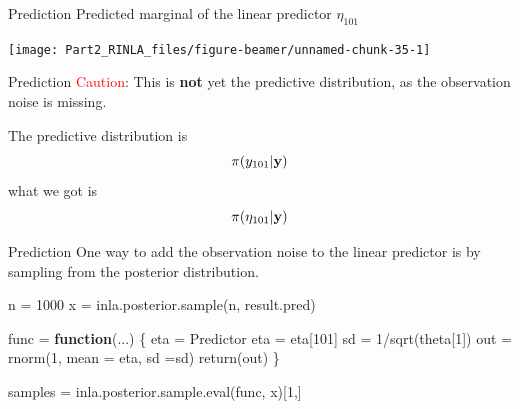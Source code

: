 \documentclass[
  ignorenonframetext,
]{beamer}
\newenvironment{Shaded}{\begin{snugshade}}{\end{snugshade}}
\newcommand{\AttributeTok}[1]{\textcolor[rgb]{0.77,0.63,0.00}{#1}}
\newcommand{\ControlFlowTok}[1]{\textcolor[rgb]{0.13,0.29,0.53}{\textbf{#1}}}
\newcommand{\DecValTok}[1]{\textcolor[rgb]{0.00,0.00,0.81}{#1}}
\newcommand{\FunctionTok}[1]{\textcolor[rgb]{0.00,0.00,0.00}{#1}}
\newcommand{\NormalTok}[1]{#1}
\newcommand{\OtherTok}[1]{\textcolor[rgb]{0.56,0.35,0.01}{#1}}
\newcommand{\SpecialCharTok}[1]{\textcolor[rgb]{0.00,0.00,0.00}{#1}}
\begin{document}
\begin{frame}[fragile]{Prediction}
\protect\hypertarget{prediction-2}{}
Predicted marginal of the linear predictor \(\eta_{101}\)

\begin{Shaded}
\end{Shaded}

\begin{center}\texttt{[image: Part2\_RINLA\_files/figure-beamer/unnamed-chunk-35-1]} \end{center}
\end{frame}

\begin{frame}{Prediction}
\protect\hypertarget{prediction-3}{}
\textcolor{red}{Caution}: This is \textbf{not} yet the predictive
distribution, as the observation noise is missing.

The predictive distribution is \[
\pi(y_{101}|\bf{y})
\] what we got is \[
\pi(\eta_{101}|\bf{y})
\]
\end{frame}

\begin{frame}[fragile]{Prediction}
\protect\hypertarget{prediction-4}{}
One way to add the observation noise to the linear predictor is by
sampling from the posterior distribution.

\small

\begin{Shaded}
\begin{Highlighting}[]
\NormalTok{n }\OtherTok{=} \DecValTok{1000}
\NormalTok{x }\OtherTok{=} \FunctionTok{inla.posterior.sample}\NormalTok{(n, result.pred)}

\NormalTok{func }\OtherTok{=} \ControlFlowTok{function}\NormalTok{(...)}
\NormalTok{\{}
\NormalTok{  eta }\OtherTok{=}\NormalTok{ Predictor}
\NormalTok{  eta }\OtherTok{=}\NormalTok{ eta[}\DecValTok{101}\NormalTok{]}
\NormalTok{  sd }\OtherTok{=} \DecValTok{1}\SpecialCharTok{/}\FunctionTok{sqrt}\NormalTok{(theta[}\DecValTok{1}\NormalTok{])}
\NormalTok{  out }\OtherTok{=} \FunctionTok{rnorm}\NormalTok{(}\DecValTok{1}\NormalTok{, }\AttributeTok{mean =}\NormalTok{ eta, }\AttributeTok{sd =}\NormalTok{sd)}
  \FunctionTok{return}\NormalTok{(out)}
\NormalTok{\}}

\NormalTok{samples }\OtherTok{=} \FunctionTok{inla.posterior.sample.eval}\NormalTok{(func, x)[}\DecValTok{1}\NormalTok{,]}
\end{Highlighting}
\end{Shaded}
\end{frame}
\end{document}
